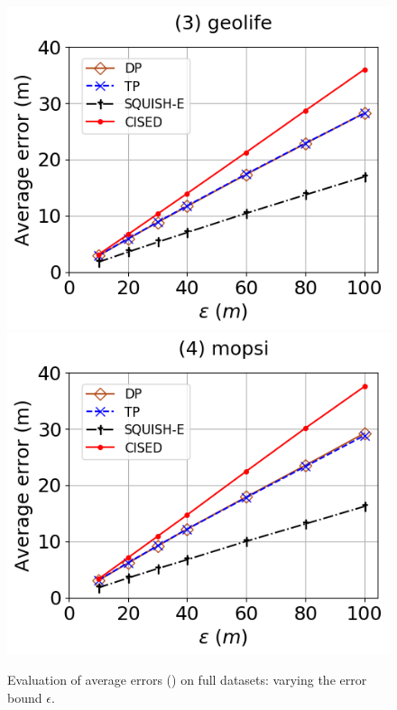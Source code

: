 \begin{figure}[tb!]
	\includegraphics[scale=0.315]{Figures/Exp-SED-error-epsilon-geolife.png}	\hspace{1ex}
	\includegraphics[scale=0.315]{Figures/Exp-SED-error-epsilon-mopsi.png}		
	\vspace{-3ex}
	\caption{\small Evaluation of average errors (\sed) on full datasets: varying the error bound $\epsilon$.}
	\label{fig:ae-sed-epsilon}
	\vspace{-2ex}
\end{figure}


